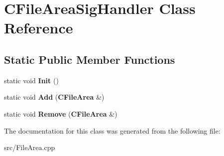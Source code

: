 \section{CFileAreaSigHandler Class Reference}
\label{classCFileAreaSigHandler}
\subsection*{Static Public Member Functions}
\begin{DoxyCompactItemize}
\item 
static void {\bfseries Init} ()\label{classCFileAreaSigHandler_a263db1c2c2a1764e1da7981efa937592}

\item 
static void {\bfseries Add} ({\bf CFileArea} \&)\label{classCFileAreaSigHandler_a7e70ad9fb48c510e86db85e94083210f}

\item 
static void {\bfseries Remove} ({\bf CFileArea} \&)\label{classCFileAreaSigHandler_a01efb5edcf6116328c37ce60848a264d}

\end{DoxyCompactItemize}


The documentation for this class was generated from the following file:\begin{DoxyCompactItemize}
\item 
src/FileArea.cpp\end{DoxyCompactItemize}
